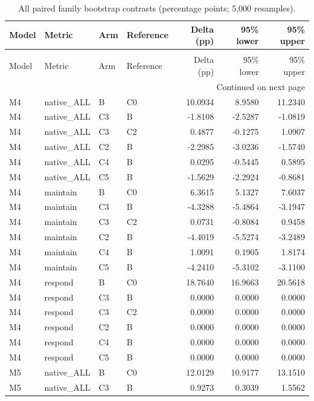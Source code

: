 \begin{longtable}{llllrrr}
\caption{All paired family bootstrap contrasts (percentage points; 5,000 resamples).} \label{tab:contrasts} \\
\toprule
Model & Metric & Arm & Reference & Delta (pp) & 95\% lower & 95\% upper \\
\midrule
\endfirsthead
\caption[]{All paired family bootstrap contrasts (percentage points; 5,000 resamples).} \\
\toprule
Model & Metric & Arm & Reference & Delta (pp) & 95\% lower & 95\% upper \\
\midrule
\endhead
\midrule
\multicolumn{7}{r}{Continued on next page} \\
\midrule
\endfoot
\bottomrule
\endlastfoot
M4 & native\_ALL & B & C0 & 10.0934 & 8.9580 & 11.2340 \\
M4 & native\_ALL & C3 & B & -1.8108 & -2.5287 & -1.0819 \\
M4 & native\_ALL & C3 & C2 & 0.4877 & -0.1275 & 1.0907 \\
M4 & native\_ALL & C2 & B & -2.2985 & -3.0236 & -1.5740 \\
M4 & native\_ALL & C4 & B & 0.0295 & -0.5445 & 0.5895 \\
M4 & native\_ALL & C5 & B & -1.5629 & -2.2924 & -0.8681 \\
M4 & maintain & B & C0 & 6.3615 & 5.1327 & 7.6037 \\
M4 & maintain & C3 & B & -4.3288 & -5.4864 & -3.1947 \\
M4 & maintain & C3 & C2 & 0.0731 & -0.8084 & 0.9458 \\
M4 & maintain & C2 & B & -4.4019 & -5.5274 & -3.2489 \\
M4 & maintain & C4 & B & 1.0091 & 0.1905 & 1.8174 \\
M4 & maintain & C5 & B & -4.2410 & -5.3102 & -3.1100 \\
M4 & respond & B & C0 & 18.7640 & 16.9663 & 20.5618 \\
M4 & respond & C3 & B & 0.0000 & 0.0000 & 0.0000 \\
M4 & respond & C3 & C2 & 0.0000 & 0.0000 & 0.0000 \\
M4 & respond & C2 & B & 0.0000 & 0.0000 & 0.0000 \\
M4 & respond & C4 & B & 0.0000 & 0.0000 & 0.0000 \\
M4 & respond & C5 & B & 0.0000 & 0.0000 & 0.0000 \\
M5 & native\_ALL & B & C0 & 12.0129 & 10.9177 & 13.1510 \\
M5 & native\_ALL & C3 & B & 0.9273 & 0.3039 & 1.5562 \\

\end{longtable}
